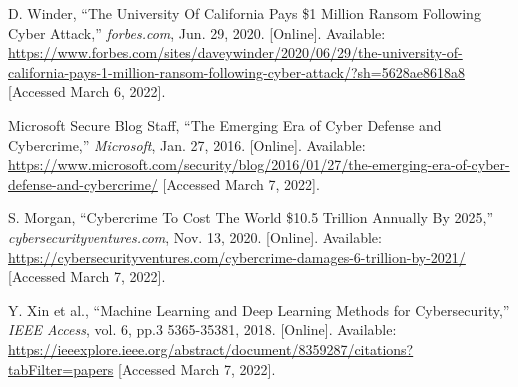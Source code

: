 \begin{thebibliography}{99}
    D. Winder, ``The University Of California Pays \$1 Million Ransom Following Cyber Attack,''
    \textit{forbes.com}, Jun. 29, 2020. [Online].
    Available: \href{https://www.forbes.com/sites/daveywinder/2020/06/29/the-university-of-california-pays-1-million-ransom-following-cyber-attack/?sh=5628ae8618a8}{https://www.forbes.com/sites/daveywinder/2020/06/29/the-university-of-california-pays-1-million-ransom-following-cyber-attack/?sh=5628ae8618a8}
    [Accessed March 6, 2022].

    Microsoft Secure Blog Staff, ``The Emerging Era of Cyber Defense and Cybercrime,''
    \textit{Microsoft}, Jan. 27, 2016. [Online].
    Available: \href{https://www.microsoft.com/security/blog/2016/01/27/the-emerging-era-of-cyber-defense-and-cybercrime/}{https://www.microsoft.com/security/blog/2016/01/27/the-emerging-era-of-cyber-defense-and-cybercrime/}
    [Accessed March 7, 2022].

    S. Morgan, ``Cybercrime To Cost The World \$10.5 Trillion Annually By 2025,''
    \textit{cybersecurityventures.com}, Nov. 13, 2020. [Online].
    Available: \href{https://cybersecurityventures.com/cybercrime-damages-6-trillion-by-2021/}{https://cybersecurityventures.com/cybercrime-damages-6-trillion-by-2021/}
    [Accessed March 7, 2022].

    Y. Xin et al., ``Machine Learning and Deep Learning Methods for Cybersecurity,''
    \textit{IEEE Access}, vol. 6, pp.3 5365-35381, 2018. [Online].
    Available: \href{https://ieeexplore.ieee.org/abstract/document/8359287/citations?tabFilter=papers}{https://ieeexplore.ieee.org/abstract/document/8359287/citations?tabFilter=papers}
    [Accessed March 7, 2022].
\end{thebibliography}
